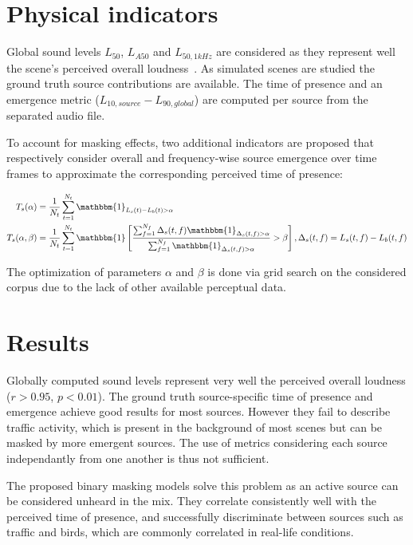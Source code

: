 \documentclass[a0,portrait]{a0poster}
\begin{document}
\begin{multicols}{2}
\section*{Physical indicators}


Global sound levels $L_{50}$, $L_{A50}$ and $L_{50, 1kHz}$ are considered as they represent well the scene's perceived overall loudness~\cite{aumond2017}. As simulated scenes are studied the ground truth source contributions are available. The time of presence and an emergence metric ($L_{10, source}-L_{90, global}$) are computed per source from the separated audio file.

To account for masking effects, two additional indicators are proposed that respectively consider overall and frequency-wise source emergence over time frames to approximate the corresponding perceived time of presence:

\begin{align}
T_s(\alpha) &= \frac{1}{N_t}\sum_{t = 1}^{N_t}\mathbbm{1}_{L_s(t) - L_b(t)>\alpha} \\
T_s(\alpha, \beta) &= \frac{1}{N_t}\sum_{t = 1}^{N_t}\mathbbm{1}\left[ \frac{\sum_{f = 1}^{N_f}\Delta_s(t, f)\mathbbm{1}_{\Delta_s(t, f)>\alpha}}{\sum_{f = 1}^{N_f}\mathbbm{1}_{\Delta_s(t, f)>\alpha}}>\beta \right], \Delta_s(t, f) = L_s(t, f) - L_b(t, f)
\end{align}

The optimization of parameters $\alpha$ and $\beta$ is done via grid search on the considered corpus due to the lack of other available perceptual data.

\section*{Results}

Globally computed sound levels represent very well the perceived overall loudness ($r>0.95$, $p<0.01$). The ground truth source-specific time of presence and emergence achieve good results for most sources. However they fail to describe traffic activity, which is present in the background of most scenes but can be masked by more emergent sources. The use of metrics considering each source independantly from one another is thus not sufficient.

The proposed binary masking models solve this problem as an active source can be considered unheard in the mix. They correlate consistently well with the perceived time of presence, and successfully discriminate between sources such as traffic and birds, which are commonly correlated in real-life conditions.


\end{multicols}
\end{document}
